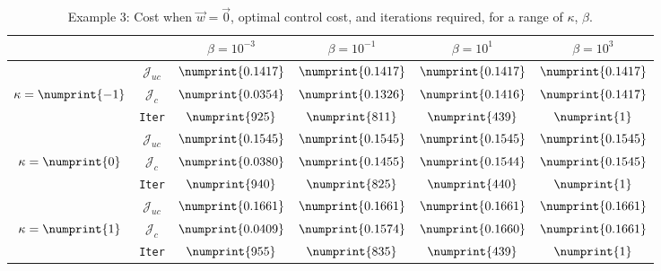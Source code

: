 \begin{table}
\begin{tabular}{ | c | c || c | c | c | c ||}
\hline
\multicolumn{2}{|c||}{}& $\beta = 10^{-3}$ & $\beta = 10^{-1}$ & $\beta = 10^{1}$ & $\beta = 10^{3}$  \\
\hline
\hline
 & $\mathcal{J}_{uc}$ & $\numprint{0.1417}$ & $\numprint{0.1417}$ & $\numprint{0.1417}$ & $\numprint{0.1417}$ \\
$\kappa= \numprint{-1}$  & $\mathcal{J}_c$ & $\numprint{0.0354}$ & $\numprint{0.1326}$ & $\numprint{0.1416}$ & $\numprint{0.1417}$ \\
& \texttt{Iter} & $\numprint{925}$ & $\numprint{811}$ & $\numprint{439}$ & $\numprint{1}$ \\
\hline
 & $\mathcal{J}_{uc}$ & $\numprint{0.1545}$ & $\numprint{0.1545}$ & $\numprint{0.1545}$ & $\numprint{0.1545}$ \\
$\kappa= \numprint{0}$  & $\mathcal{J}_c$ & $\numprint{0.0380}$ & $\numprint{0.1455}$ & $\numprint{0.1544}$ & $\numprint{0.1545}$ \\
& \texttt{Iter} & $\numprint{940}$ & $\numprint{825}$ & $\numprint{440}$ & $\numprint{1}$ \\
\hline
 & $\mathcal{J}_{uc}$ & $\numprint{0.1661}$ & $\numprint{0.1661}$ & $\numprint{0.1661}$ & $\numprint{0.1661}$ \\
$\kappa= \numprint{1}$  & $\mathcal{J}_c$ & $\numprint{0.0409}$ & $\numprint{0.1574}$ & $\numprint{0.1660}$ & $\numprint{0.1661}$ \\
& \texttt{Iter} & $\numprint{955}$ & $\numprint{835}$ & $\numprint{439}$ & $\numprint{1}$ \\
\hline
\end{tabular}
\caption{Example 3: Cost when $\vec{w}=\vec{0}$, optimal control cost, and iterations required, for a range of $\kappa$, $\beta$.}
\label{TabS5:Prob3}
\end{table}